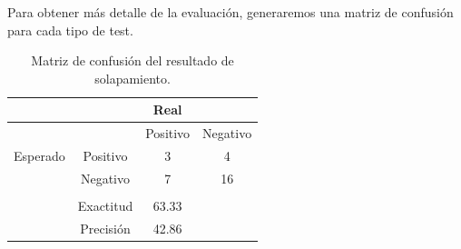 Para obtener más detalle de la evaluación, generaremos una matriz de confusión para cada tipo de test.

\begin{table}[H]
	\centering
	\begin{tabular}{|c|c|c|c|}
		\hline
		& & Real &   \\
		\hline
		&          & Positivo & Negativo                   \\
		\hline
		Esperado & Positivo & 3& 4 \\
		\hline
		& Negativo & 		  7& 16                 \\
		\hline
 						&&&\\
		\hline
		&Exactitud& 63.33 & \\
		\hline
		&Precisión& 42.86 &\\
		\hline
	\end{tabular}
	\caption{Matriz de confusión del resultado de solapamiento.}
	\label{table:mt_ori_sol}
\end{table}

